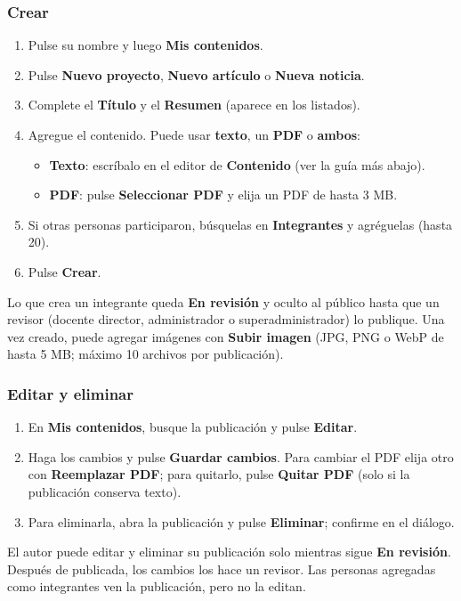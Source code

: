 \documentclass[11pt,a4paper]{article}
\newcommand{\boton}[1]{\textbf{\textcolor{siiisazul}{#1}}}
\begin{document}
\subsubsection*{Crear}
\begin{enumerate}
  \item Pulse su nombre y luego \boton{Mis contenidos}.
  \item Pulse \boton{Nuevo proyecto}, \boton{Nuevo art\'iculo} o \boton{Nueva noticia}.
  \item Complete el \textbf{T\'itulo} y el \textbf{Resumen} (aparece en los listados).
  \item Agregue el contenido. Puede usar \textbf{texto}, un \textbf{PDF} o \textbf{ambos}:
    \begin{itemize}
      \item \textbf{Texto}: escr\'ibalo en el editor de \textbf{Contenido} (ver la gu\'ia m\'as abajo).
      \item \textbf{PDF}: pulse \boton{Seleccionar PDF} y elija un PDF de hasta 3 MB.
    \end{itemize}
  \item Si otras personas participaron, b\'usquelas en \textbf{Integrantes} y agr\'eguelas (hasta 20).
  \item Pulse \boton{Crear}.
\end{enumerate}
Lo que crea un integrante queda \textbf{En revisi\'on} y oculto al p\'ublico hasta que un revisor (docente director,
administrador o superadministrador) lo publique. Una vez creado, puede agregar im\'agenes con \boton{Subir imagen} (JPG,
PNG o WebP de hasta 5 MB; m\'aximo 10 archivos por publicaci\'on).

\subsubsection*{Editar y eliminar}
\begin{enumerate}
  \item En \boton{Mis contenidos}, busque la publicaci\'on y pulse \boton{Editar}.
  \item Haga los cambios y pulse \boton{Guardar cambios}. Para cambiar el PDF elija otro con \boton{Reemplazar PDF};
    para quitarlo, pulse \boton{Quitar PDF} (solo si la publicaci\'on conserva texto).
  \item Para eliminarla, abra la publicaci\'on y pulse \boton{Eliminar}; confirme en el di\'alogo.
\end{enumerate}
El autor puede editar y eliminar su publicaci\'on solo mientras sigue \textbf{En revisi\'on}. Despu\'es de publicada,
los cambios los hace un revisor. Las personas agregadas como integrantes ven la publicaci\'on, pero no la editan.
\end{document}
